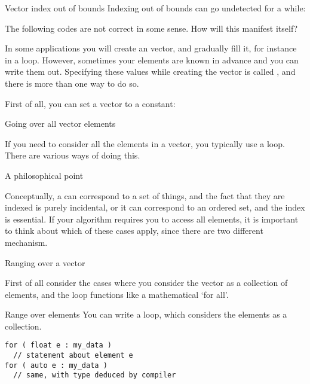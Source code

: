 \begin{block}{Vector index out of bounds}
  Indexing out of bounds can go undetected for a while:
  
\end{block}

\begin{review}
  The following codes are not correct in some sense. How will this manifest itself?
\end{review}

In some applications you will create an vector, and gradually fill it,
for instance in a loop. However, sometimes your elements are known in
advance and you can write them out. Specifying these values while
creating the vector is called , and
there is more than one way to do so.

First of all, you can set a vector to a constant:

 {Going over all vector elements}
\label{sec:arrayrange}

If you need to consider all the elements in a vector, you typically
use a  loop. There are various ways of doing this.

\begin{block}{A philosophical point}
  \label{sl:vector-access-types}

  Conceptually, a  can correspond to a set of things,
  and the fact that they are indexed is purely incidental,
  or it can correspond to an ordered set,
  and the index is essential.
  If your algorithm requires you to access all elements,
  it is important to think about which of these cases apply,
  since there are two different mechanism.
\end{block}

 {Ranging over a vector}

First of all consider the cases where you consider the vector as a
collection of elements, and the loop functions like a mathematical
`for all'.

\begin{block}{Range over elements}
  \label{sl:vector-range}
  You can write a  loop, which
  considers the elements as a collection.
\begin{lstlisting}
for ( float e : my_data )
  // statement about element e
for ( auto e : my_data )
  // same, with type deduced by compiler
\end{lstlisting}
\end{block}

